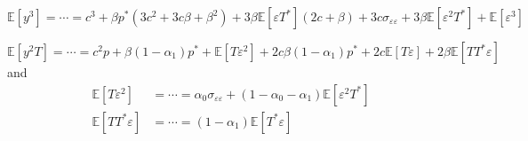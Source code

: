 \documentclass[12pt]{article}
\begin{document}
\[
  \mathbb{E}[y^3] = \cdots = c^3 + \beta p^* \left( 3 c^2 + 3 c\beta + \beta^2 \right) + 3 \beta \mathbb{E}[\varepsilon T^*] (2c + \beta) + 3 c \sigma_{\varepsilon\varepsilon} + 3\beta \mathbb{E}[\varepsilon^2 T^*] + \mathbb{E}[\varepsilon^3]
\]

\[
  \mathbb{E}\left[ y^2T \right] = \cdots = c^2 p + \beta(1 - \alpha_1)p^* + \mathbb{E}[T\varepsilon^2] + 2 c \beta(1 - \alpha_1) p^* + 2 c \mathbb{E}[T\varepsilon] + 2 \beta \mathbb{E}[TT^* \varepsilon] 
\]
and 
\begin{align*}
  \mathbb{E}[T\varepsilon^2] &= \cdots = \alpha_0 \sigma_{\varepsilon\varepsilon} + (1 - \alpha_0 - \alpha_1) \mathbb{E}[\varepsilon^2 T^*]\\
  \mathbb{E}[TT^*\varepsilon] &= \cdots = (1 - \alpha_1) \mathbb{E}[T^*\varepsilon] 
\end{align*}
\end{document}
